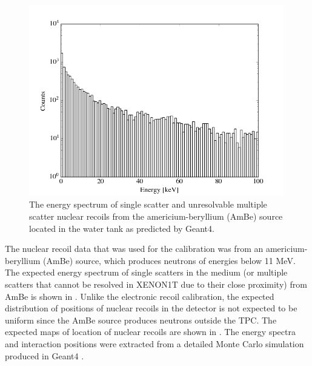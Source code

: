 \begin{figure}[t]
        \centering
	\includegraphics[width=0.99\textwidth]{xe1t_nr_energy_spec}
	\caption{The energy spectrum of single scatter and unresolvable multiple scatter nuclear recoils from the americium-beryllium (AmBe) source located in the water tank as predicted by Geant4.}
	\label{fig:xe1t_nr_energy_spec}
\end{figure}


The nuclear recoil data that was used for the calibration was from an americium-beryllium (AmBe) source, which produces neutrons of energies below 11 MeV.  The expected energy spectrum of single scatters in the medium (or multiple scatters that cannot be resolved in XENON1T due to their close proximity) from AmBe is shown in .  Unlike the electronic recoil calibration, the expected distribution of positions of nuclear recoils in the detector is not expected to be uniform since the AmBe source produces neutrons outside the TPC.  The expected maps of location of nuclear recoils are shown in .  The energy spectra and interaction positions were extracted from a detailed Monte Carlo simulation produced in Geant4 \cite{agostinelli2003geant4}.




